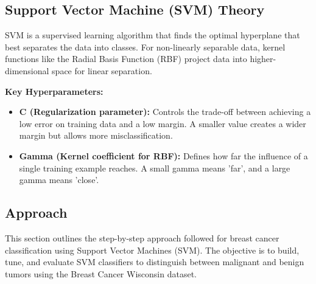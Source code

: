\documentclass[a4paper,12pt]{article}
\begin{document}
\subsection{Support Vector Machine (SVM) Theory}
SVM is a supervised learning algorithm that finds the optimal hyperplane that best separates the data into classes. For non-linearly separable data, kernel functions like the Radial Basis Function (RBF) project data into higher-dimensional space for linear separation.

\textbf{Key Hyperparameters:}
\begin{itemize}
    \item \textbf{C (Regularization parameter):} Controls the trade-off between achieving a low error on training data and a low margin. A smaller value creates a wider margin but allows more misclassification.
    \item \textbf{Gamma (Kernel coefficient for RBF):} Defines how far the influence of a single training example reaches. A small gamma means 'far', and a large gamma means 'close'.
\end{itemize}

\subsection{Approach}

This section outlines the step-by-step approach followed for breast cancer classification using Support Vector Machines (SVM). The objective is to build, tune, and evaluate SVM classifiers to distinguish between malignant and benign tumors using the Breast Cancer Wisconsin dataset.
\end{document}
